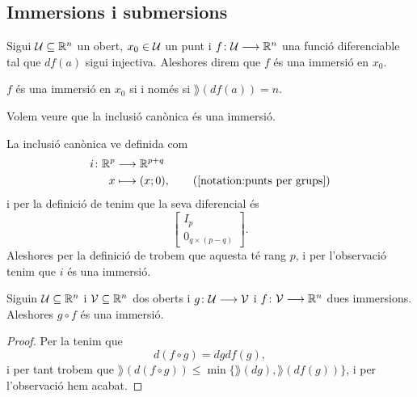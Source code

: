 \documentclass[../Apunts.tex]{subfiles}
\begin{document}
	\subsection{Immersions i submersions}
	\begin{definition}[Immersió]
		\label{def:immersió}
		Sigui \(\mathcal{U}\subseteq\mathbb{R}^{n}\) un obert, \(x_{0}\in\mathcal{U}\) un punt i \(f\colon\mathcal{U}\longrightarrow\mathbb{R}^{n}\) una funció diferenciable tal que \(df(a)\) sigui injectiva. Aleshores direm que \(f\) és una immersió en \(x_{0}\).
	\end{definition}
	\begin{observation} %
		\label{obs:immersió si i només si té rang maximal}
		\(f\) és una immersió en \(x_{0}\) si i només si \(\rang(df(a))=n\).
	\end{observation}
	\begin{example}
		\label{ex:la inclusió canònica és una immersió}
		Volem veure que la inclusió canònica és una immersió.
		\begin{solution}
			La inclusió canònica ve definida com
			\begin{align*}
				i\colon\mathbb{R}^{p}&\longrightarrow\mathbb{R}^{p+q} \\
				x&\longmapsto(x;0), \tag{\ref{notation:punts per grups}}
			\end{align*}
			i per la definició de  tenim que la seva diferencial és
			\[\left[\begin{array}{c}
				I_{p} \\\hline
				0_{q\times(p-q)}
			\end{array}\right].\]
			Aleshores per la definició de  trobem que aquesta té rang \(p\), i per l'observació  tenim que \(i\) és una immersió.
		\end{solution}
	\end{example}
	\begin{proposition}
		\label{prop:la composició d'immersions és una immersió}
		Siguin \(\mathcal{U}\subseteq\mathbb{R}^{n}\) i \(\mathcal{V}\subseteq\mathbb{R}^{n}\) dos oberts i \(g\colon\mathcal{U}\longrightarrow\mathcal{V}\) i \(f\colon\mathcal{V}\longrightarrow\mathbb{R}^{n}\) dues immersions. Aleshores \(g\circ f\) és una immersió.
		\begin{proof}
			Per la  tenim que
			\[d(f\circ g)=dgdf(g),\] %
			i per tant trobem que \(\rang(d(f\circ g))\leq\min\{\rang(dg),\rang(df(g))\}\), i per l'observació  hem acabat.
		\end{proof}
	\end{proposition}
\end{document}
